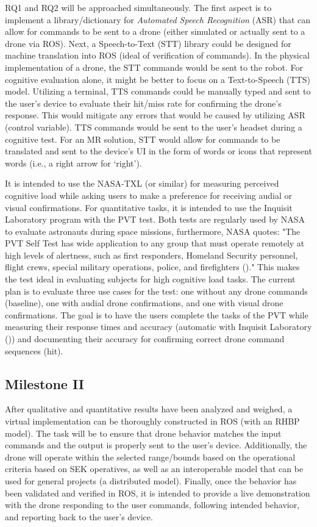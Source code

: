 RQ1 and RQ2 will be approached simultaneously. The first aspect is to implement a library/dictionary for \textit{Automated Speech Recognition} (ASR) that can allow for commands to be sent to a drone (either simulated or actually sent to a drone via ROS). Next, a Speech-to-Text (STT) library could be designed for machine translation into ROS (ideal of verification of commands). In the physical implementation of a drone, the STT commands would be sent to the robot. For cognitive evaluation alone, it might be better to focus on a Text-to-Speech (TTS) model. Utilizing a terminal, TTS commands could be manually typed and sent to the user's device to evaluate their hit/miss rate for confirming the drone's response. This would mitigate any errors that would be caused by utilizing ASR (control variable). TTS commands would be sent to the user's headset during a cognitive test. For an MR solution, STT would allow for commands to be translated and sent to the device's UI in the form of words or icons that represent words (i.e., a right arrow for `right'). 
\smallskip

It is intended to use the NASA-TXL (or similar) for measuring perceived cognitive load while asking users to make a preference for receiving audial or visual confirmations. For quantitative tasks, it is intended to use the Inquisit Laboratory program with the PVT test. Both tests are regularly used by NASA to evaluate astronauts during space missions, furthermore, NASA quotes: "The PVT Self Test has wide application to any group that must operate remotely at high levels of alertness, such as first responders, Homeland Security personnel, flight crews, special military operations, police, and firefighters (\cite{nasa1})." This makes the test ideal in evaluating subjects for high cognitive load tasks. The current plan is to evaluate three use cases for the test: one without any drone commands (baseline), one with audial drone confirmations, and one with visual drone confirmations. The goal is to have the users complete the tasks of the PVT while measuring their response times and accuracy (automatic with Inquisit Laboratory (\cite{Millisecond})) and documenting their accuracy for confirming correct drone command sequences (hit). 

\subsection{Milestone II}
After qualitative and quantitative results have been analyzed and weighed, a virtual implementation can be thoroughly constructed in ROS (with an RHBP model). The task will be to ensure that drone behavior matches the input commands and the output is properly sent to the user's device. Additionally, the drone will operate within the selected range/bounds based on the operational criteria based on SEK operatives, as well as an interoperable model that can be used for general projects (a distributed model). Finally, once the behavior has been validated and verified in ROS, it is intended to provide a live demonstration with the drone responding to the user commands, following intended behavior, and reporting back to the user's device. 
\smallskip

